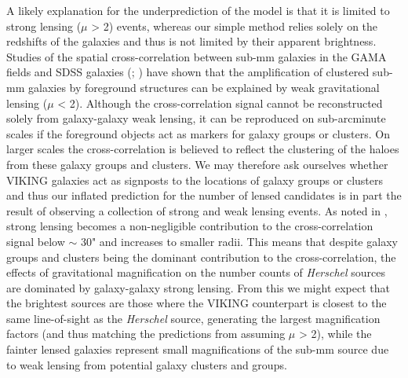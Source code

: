 A likely explanation for the underprediction of the \citealt{Cai_2013} model is that it is limited to strong lensing ($\mu$ > 2) events, whereas our simple method relies solely on the redshifts of the galaxies and thus is not limited by their apparent brightness. Studies of the spatial cross-correlation between sub-mm galaxies in the GAMA fields and SDSS galaxies (\citealt{Gonzalez-Nuevo_2014}; \citealt{Gonzalez-Nuevo_2017}) have shown that the amplification of clustered sub-mm galaxies by foreground structures can be explained by weak gravitational lensing ($\mu$ < 2). Although the cross-correlation signal cannot be reconstructed solely from galaxy-galaxy weak lensing, it can be reproduced on sub-arcminute scales if the foreground objects act as markers for galaxy groups or clusters. On larger scales the cross-correlation is believed to reflect the clustering of the haloes from these galaxy groups and clusters. We may therefore ask ourselves whether VIKING galaxies act as signposts to the locations of galaxy groups or clusters and thus our inflated prediction for the number of lensed candidates is in part the result of observing a collection of strong and weak lensing events. As noted in \citealt{Gonzalez-Nuevo_2017}, strong lensing becomes a non-negligible contribution to the cross-correlation signal below $\sim$ 30" and increases to smaller radii. This means that despite galaxy groups and clusters being the dominant contribution to the cross-correlation, the effects of gravitational magnification on the number counts of \textit{Herschel} sources are dominated by galaxy-galaxy strong lensing. From this we might expect that the brightest sources are those where the VIKING counterpart is closest to the same line-of-sight as the \textit{Herschel} source, generating the largest magnification factors (and thus matching the predictions from \citealt{Cai_2013} assuming $\mu$ > 2), while the fainter lensed galaxies represent small magnifications of the sub-mm source due to weak lensing from potential galaxy clusters and groups.


